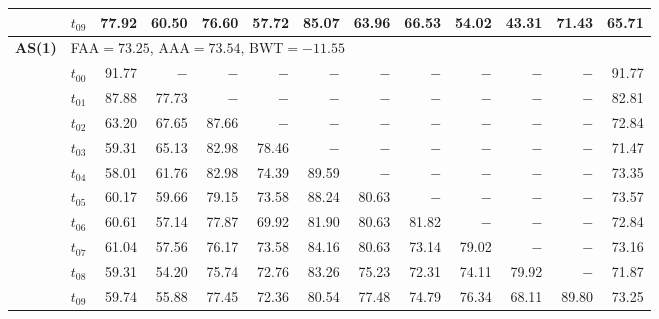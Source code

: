 \begin{table}[ht]
\begin{tabular}{@{}l l r r r r r r r r r r r@{}}
 & $t_{09}$ & 77.92 & 60.50 & 76.60 & 57.72 & 85.07 & 63.96 & 66.53 & 54.02 & 43.31 & 71.43 & 65.71 \\
\midrule
\multirow{11}{*}{\textbf{AS(1)}} & \multicolumn{12}{l}{\quad\small FAA$=73.25$,\; AAA$=73.54$,\; BWT$=-11.55$} \\
 & $t_{00}$ & 91.77 & $-$ & $-$ & $-$ & $-$ & $-$ & $-$ & $-$ & $-$ & $-$ & 91.77 \\
 & $t_{01}$ & 87.88 & 77.73 & $-$ & $-$ & $-$ & $-$ & $-$ & $-$ & $-$ & $-$ & 82.81 \\
 & $t_{02}$ & 63.20 & 67.65 & 87.66 & $-$ & $-$ & $-$ & $-$ & $-$ & $-$ & $-$ & 72.84 \\
 & $t_{03}$ & 59.31 & 65.13 & 82.98 & 78.46 & $-$ & $-$ & $-$ & $-$ & $-$ & $-$ & 71.47 \\
 & $t_{04}$ & 58.01 & 61.76 & 82.98 & 74.39 & 89.59 & $-$ & $-$ & $-$ & $-$ & $-$ & 73.35 \\
 & $t_{05}$ & 60.17 & 59.66 & 79.15 & 73.58 & 88.24 & 80.63 & $-$ & $-$ & $-$ & $-$ & 73.57 \\
 & $t_{06}$ & 60.61 & 57.14 & 77.87 & 69.92 & 81.90 & 80.63 & 81.82 & $-$ & $-$ & $-$ & 72.84 \\
 & $t_{07}$ & 61.04 & 57.56 & 76.17 & 73.58 & 84.16 & 80.63 & 73.14 & 79.02 & $-$ & $-$ & 73.16 \\
 & $t_{08}$ & 59.31 & 54.20 & 75.74 & 72.76 & 83.26 & 75.23 & 72.31 & 74.11 & 79.92 & $-$ & 71.87 \\
 & $t_{09}$ & 59.74 & 55.88 & 77.45 & 72.36 & 80.54 & 77.48 & 74.79 & 76.34 & 68.11 & 89.80 & 73.25 \\
\bottomrule
\end{tabular}
\end{table}

